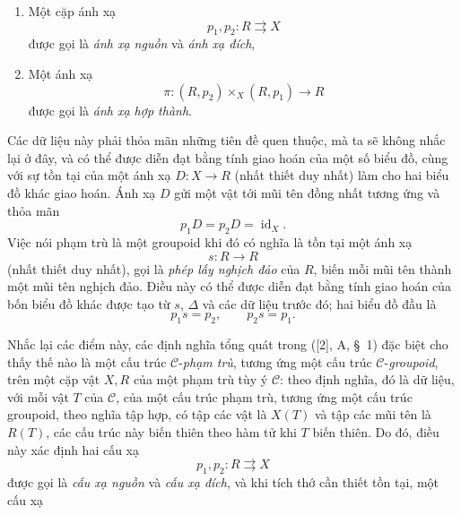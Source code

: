 \begin{enumerate}
\item[(i)] Một cặp ánh xạ
\[
  p_1,p_2:R\rightrightarrows X
\]
được gọi là \emph{ánh xạ nguồn} và \emph{ánh xạ đích},

\item[(ii)] Một ánh xạ
\[
  \pi:(R,p_2)\times_X(R,p_1)\longrightarrow R
\]
được gọi là \emph{ánh xạ hợp thành}.
\end{enumerate}
Các dữ liệu này phải thỏa mãn những tiên đề quen thuộc, mà ta sẽ không nhắc
lại ở đây, và có thể được diễn đạt bằng tính giao hoán của một số biểu đồ,
cùng với sự tồn tại của một ánh xạ $D:X\to R$ (nhất thiết duy nhất) làm cho
hai biểu đồ khác giao hoán. Ánh xạ $D$ gửi một vật tới mũi tên đồng nhất tương ứng
và thỏa mãn
\[
  p_1D=p_2D=\operatorname{id}_X.
\]
Việc nói phạm trù là một groupoid khi đó có nghĩa là tồn tại một ánh xạ
\[
  s:R\longrightarrow R
\]
(nhất thiết duy nhất), gọi là \emph{phép lấy nghịch đảo} của $R$, biến mỗi
mũi tên thành một mũi tên nghịch đảo. Điều này có thể được diễn đạt bằng tính
giao hoán của bốn biểu đồ khác được tạo từ $s$, $\Delta$ và các dữ liệu trước
đó; hai biểu đồ đầu là
\[
  p_1s=p_2,\qquad p_2s=p_1.
\]

Nhắc lại các điểm này, các định nghĩa tổng quát trong ([2], A, \S~1) đặc biệt
cho thấy thế nào là một cấu trúc $\mathcal C$-\emph{phạm trù}, tương ứng một
cấu trúc $\mathcal C$-\emph{groupoid}, trên một cặp vật $X,R$ của một phạm trù
tùy ý $\mathcal C$: theo định nghĩa, đó là dữ liệu, với mỗi vật $T$ của
$\mathcal C$, của một cấu trúc phạm trù, tương ứng một cấu trúc groupoid, theo
nghĩa tập hợp, có tập các vật là $X(T)$ và tập các mũi tên là $R(T)$, các cấu
trúc này \guillemotleft biến thiên theo hàm tử\guillemotright{} khi $T$ biến
thiên. Do đó, điều này xác định hai cấu xạ
\[
  p_1,p_2:R\rightrightarrows X
\]
được gọi là \emph{cấu xạ nguồn} và \emph{cấu xạ đích}, và khi tích thớ cần
thiết tồn tại, một cấu xạ
